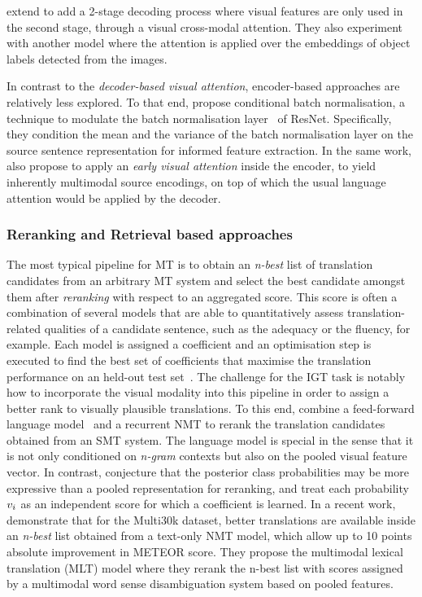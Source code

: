 \documentclass{svjour3}
\begin{document}
\cite{ive-etal-2019-distilling} extend \cite{libovicky-tfatt-2018} to add a 2-stage decoding process where visual features are only used in the second stage, through a visual cross-modal attention. They also experiment with another model where the attention is applied over the embeddings of object labels detected from the images.




In contrast to the \textit{decoder-based visual attention}, encoder-based approaches are relatively less explored. To that end, \cite{delbrouck-modulating-2017} propose conditional batch normalisation, a technique to modulate the batch normalisation layer~\citep{ioffe-batch-2015} of ResNet. Specifically, they condition the mean and the variance of the batch normalisation layer on the source sentence representation for informed feature extraction. In the same work,
\cite{delbrouck-modulating-2017} also propose to apply an \textit{early visual attention} inside the encoder, to yield inherently multimodal source encodings, on top of which the usual language attention would be applied by the decoder.


\subsubsection{Reranking and Retrieval based approaches}
\label{sec:tasks:ict:pipeline}
The most typical pipeline for MT is to obtain an \textit{n-best} list of translation candidates from an arbitrary MT system and select the best candidate amongst them after \textit{reranking} with respect to an aggregated score. This score is often a combination of several models that are able to quantitatively assess translation-related qualities of a candidate sentence, such as the adequacy or the fluency, for example. Each model is assigned a coefficient and an optimisation step is executed to find the best set of coefficients that maximise the translation performance on an held-out test set~\citep{och-mert-2003}.
The challenge for the IGT task is notably how to incorporate the visual modality into this pipeline in order to assign a better rank to visually plausible translations. To this end, \citet{caglayan-does-2016} combine a feed-forward language model~\citep{bengio-nplm-2003,schwenk-cslm-2006} and a recurrent NMT to rerank the translation candidates obtained from an SMT system. The language model is special in the sense that it is not only conditioned on \textit{n-gram} contexts but also on the pooled visual feature vector. In contrast, \citet{shah-wang-specia:2016:WMT} conjecture that the posterior class probabilities may be more expressive than a pooled representation for reranking, and treat each probability ${v}_{i}$ as an independent score for which a coefficient is learned.
In a recent work, \citet{lala-EtAl:2018:WMT} demonstrate that for the Multi30k dataset,
better translations are available inside an \textit{n-best} list obtained from a text-only NMT model, which allow up to 10 points absolute improvement in METEOR score.
They propose the multimodal lexical translation (MLT) model where they rerank the n-best list with scores assigned by a multimodal word sense disambiguation system based on pooled features.
\end{document}
